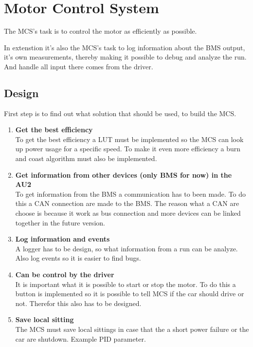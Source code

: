 \section{Motor Control System}

The MCS's task is to control the motor as efficiently as possible. 

In extenstion it's also the MCS's task to log information about the BMS output, it's own measurements, thereby making it possible to debug and analyze the run. \\
And handle all input there comes from the driver.

\subsection{Design}

First step is to find out what solution that should be used, to build the MCS. 

\begin{enumerate}
	\item \textbf{Get the best efficiency}\\
	To get the best efficiency a LUT must be implemented so the MCS can look up power usage for a specific speed. To make it even more efficiency a burn and coast algorithm must also be implemented. \\
	\item \textbf{Get information from other devices (only BMS for now) in the AU2}\\
	To get information from the BMS a communication has to been made. To do this a CAN connection are made to the BMS. The reason what a CAN are choose is because it work as bus connection and more devices can be linked together in the future version.\\
	\item \textbf{Log information and events}\\
	A logger has to be design, so what information from a run can be analyze. Also log events so it is easier to find bugs.\\
	\item \textbf{Can be control by the driver}\\
	It is important what it is possible to start or stop the motor. To do this a button is implemented so it is possible to tell MCS if the car should drive or not. Therefor this also has to be designed.\\
	\item \textbf{Save local sitting}\\
	The MCS must save local sittings in case that the a short power failure or the car are shutdown. Example PID parameter.\\
\end{enumerate}

